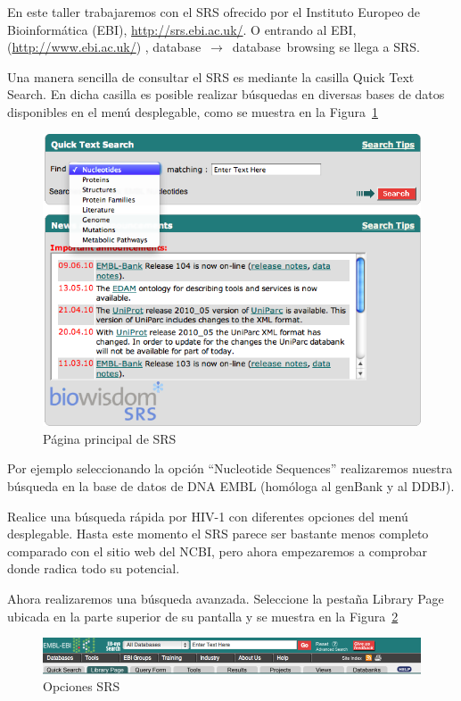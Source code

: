 \documentclass[letter,11pt]{book}
\begin{document}
En este taller trabajaremos con el SRS ofrecido por el Instituto Europeo de Bioinformática (EBI), \url{http://srs.ebi.ac.uk/}. O entrando al EBI, (\url{http://www.ebi.ac.uk/}) , database~$\rightarrow$~database~browsing se llega a SRS. 

Una manera sencilla de consultar el SRS es mediante la casilla Quick Text Search. En dicha casilla es posible realizar búsquedas en diversas bases de datos disponibles en el menú desplegable, como se muestra en la Figura~\ref{screenshoteSRS}

\begin{figure}[ht]
\centering
   \includegraphics[width=15cm]{Figs/screenshorSRS.png}
  \caption{\label{screenshoteSRS}Página principal de SRS}
\end{figure}

Por ejemplo seleccionando la opción “Nucleotide Sequences” realizaremos nuestra búsqueda en la base de datos de DNA EMBL (homóloga al genBank y al DDBJ).

Realice una búsqueda rápida por HIV-1 con diferentes opciones del menú desplegable. Hasta este momento el SRS parece ser bastante menos completo comparado con el sitio web del NCBI, pero ahora empezaremos a comprobar donde radica todo su potencial.

Ahora realizaremos una búsqueda avanzada. Seleccione la pestaña Library Page ubicada en la parte superior de su pantalla y se muestra en la Figura~\ref{opcionesSRS}

\begin{figure}[ht]
\centering
   \includegraphics[width=15cm]{Figs/SRSMenu.png}
  \caption{\label{opcionesSRS}Opciones SRS}
\end{figure}
\end{document}
